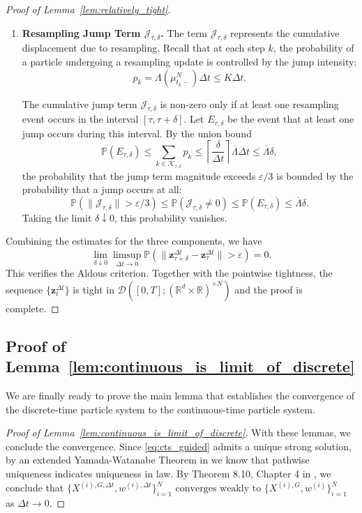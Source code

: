 \documentclass{article}
\newcommand{\mathbbm}[1]{\boldsymbol{#1}}
\theoremstyle{plain}
\theoremstyle{definition}
\theoremstyle{remark}
\renewcommand{\P}{{\mathbb{P}}}
\newcommand{\R}{{\mathbb{R}}}
\begin{document}
\begin{proof}[Proof of Lemma~\ref{lem:relatively_tight}]
\begin{enumerate}
        \item \textbf{Resampling Jump Term $\mathcal{J}_{\tau,\delta}$.}
        The term $\mathcal{J}_{\tau,\delta}$ represents the cumulative displacement due to resampling. Recall that at each step $k$, the probability of a particle undergoing a resampling update is controlled by the jump intensity:
        \[
        p_k = \Lambda(\mu^N_{t_k-})\Delta t \le K \Delta t.
        \]
        
        The cumulative jump term $\mathcal{J}_{\tau,\delta}$ is non-zero only if at least one resampling event occurs in the interval $[\tau, \tau+\delta]$. Let $E_{\tau, \delta}$ be the event that at least one jump occurs during this interval. By the union bound \[\P(E_{\tau, \delta}) \le \sum_{k \in \mathcal{K}_{\tau, \delta}} p_k \le \left\lceil \frac{\delta}{\Delta t} \right\rceil \overline{\Lambda} \Delta t \le \overline{\Lambda} \delta,\] the probability that the jump term magnitude exceeds $\varepsilon/3$ is bounded by the probability that a jump occurs at all:
        \[
        \P(\|\mathcal{J}_{\tau,\delta}\| > \varepsilon/3) \le \P(\mathcal{J}_{\tau,\delta} \neq 0) \leq \P(E_{\tau, \delta}) \le \overline{\Lambda} \delta.
        \]
        Taking the limit $\delta \downarrow 0$, this probability vanishes.
    \end{enumerate}
    
    Combining the estimates for the three components, we have \[
        \lim_{\delta \downarrow 0} \limsup_{\Delta t \to 0} \P\left( \|\mathbbm{z}^{\Delta t}_{\tau+\delta} - \mathbbm{z}^{\Delta t}_{\tau}\| > \varepsilon \right) = 0.
    \] 
    This verifies the Aldous criterion. Together with the pointwise tightness, the sequence $\{\mathbbm{z}^{\Delta t}_{t}\}$ is tight in $\mathcal{D}([0,T]; (\R^d \times \R)^{\times N})$ and the proof is complete.
\end{proof}

\subsection{Proof of Lemma~\ref{lem:continuous_is_limit_of_discrete}}

We are finally ready to prove the main lemma that establishes the convergence of the discrete-time particle system to the continuous-time particle system.

\begin{proof}[Proof of Lemma~\ref{lem:continuous_is_limit_of_discrete}]


    
    With these lemmas, we conclude the convergence. Since \eqref{eq:cts_guided} admits a unique strong solution, by an extended Yamada-Watanabe Theorem in \cite{BarczyLiPap2015} we know that pathwise uniqueness indicates uniqueness in law. By Theorem 8.10, Chapter 4 in \cite{ethierkurtz1986}, we conclude that \(\{X^{(i),G,\Delta t},w^{(i),\Delta t}\}_{i=1}^N \text{ converges weakly to } \{X^{(i),G},w^{(i)}\}_{i=1}^N\) as \(\Delta t\rightarrow 0\).
\end{proof}
    
\end{document}
